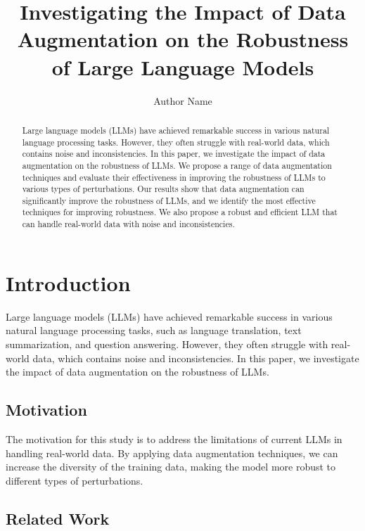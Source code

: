 \documentclass{article}
\begin{document}
\title{Investigating the Impact of Data Augmentation on the Robustness of Large Language Models}

\author{Author Name}

\maketitle

\begin{abstract}
Large language models (LLMs) have achieved remarkable success in various natural language processing tasks. However, they often struggle with real-world data, which contains noise and inconsistencies. In this paper, we investigate the impact of data augmentation on the robustness of LLMs. We propose a range of data augmentation techniques and evaluate their effectiveness in improving the robustness of LLMs to various types of perturbations. Our results show that data augmentation can significantly improve the robustness of LLMs, and we identify the most effective techniques for improving robustness. We also propose a robust and efficient LLM that can handle real-world data with noise and inconsistencies.
\end{abstract}

\section{Introduction}

Large language models (LLMs) have achieved remarkable success in various natural language processing tasks, such as language translation, text summarization, and question answering. However, they often struggle with real-world data, which contains noise and inconsistencies. In this paper, we investigate the impact of data augmentation on the robustness of LLMs.

\subsection{Motivation}

The motivation for this study is to address the limitations of current LLMs in handling real-world data. By applying data augmentation techniques, we can increase the diversity of the training data, making the model more robust to different types of perturbations.

\subsection{Related Work}
\end{document}

